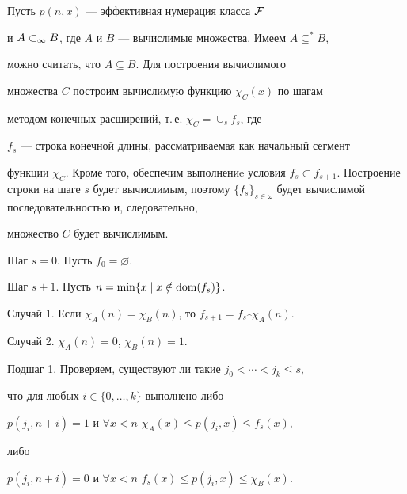 \begin{pf}


Пусть $p(n,x)$ --- эффективная нумерация класса $\cal{F}$


и ${A}\subset_\infty{B}$, где $A$ и $B$ --- вычислимые множества. Имеем $A\subseteq^* B$,


можно считать, что $A\subseteq B$. Для построения вычислимого


множества $C$ построим вычислимую функцию $\chi_C(x)$ по шагам


методом конечных расширений, т.\,е. $\chi_C=\cup_sf_s$, где


$f_s$ --- строка конечной длины, рассматриваемая как начальный сегмент


функции $\chi_C$. Кроме того, обеспечим выполнениe условия $f_s\subset


f_{s+1}$. Построение строки на шаге $s$ будет вычислимым, поэтому $\{f_s\}_


{s\in\omega}$ будет вычислимой последовательностью и, следовательно,


множество $C$ будет вычислимым.





Шаг $s=$0. Пусть $f_0=\varnothing$.





Шаг $s+1$. Пусть $n=\min\{x\mid x\notin \operatorname{dom}(f_s)\}$.





Случай 1. Если $\chi_A(n)=\chi_B(n)$, то $f_{s+1}=f_s\widehat{~~}\chi_A(n)$.





Случай 2. $\chi_A(n)=0$, $\chi_B(n)=1$.





Подшаг 1. Проверяем, существуют ли такие $j_0<\dotsb<j_k\le s$,


что для любых $i\in\{0,\dotsc,k\}$ выполнено либо





$p(j_i,n+i)=1$ и $\forall x<n$ $\chi_A(x)\le p(j_i,x)\le f_s(x)$,





\noindent{}либо





$p(j_i,n+i)=0$ и $\forall x<n$ $f_s(x)\le p(j_i,x)\le\chi_B(x)$.






\end{pf}
